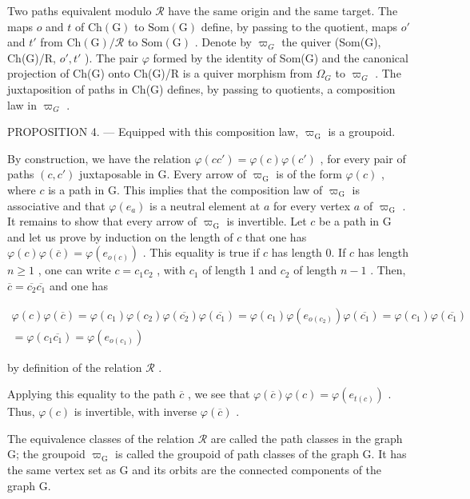 Two paths equivalent modulo \(\mathcal{R}\) have the same origin and the same target. The maps \(o\) and \(t\) of \(\mathrm{Ch(G)}\) to \(\mathrm{Som(G)}\) define, by passing to the quotient, maps \(o'\) and \(t'\) from \(\mathrm{Ch(G)/\mathcal{R}}\) to \(\mathrm{Som(G)}\) . Denote by \(\varpi_{G}\) the quiver (Som(G), Ch(G)/R, \(o', t'\) ). The pair \(\varphi\) formed by the identity of Som(G) and the canonical projection of Ch(G) onto Ch(G)/R is a quiver morphism from \(\Omega_{G}\) to \(\varpi_{G}\) . The juxtaposition of paths in Ch(G) defines, by passing to quotients, a composition law in \(\varpi_{G}\) .

PROPOSITION 4. --- Equipped with this composition law, \(\varpi_{\mathrm{G}}\) is a groupoid.

By construction, we have the relation \(\varphi(cc') = \varphi(c)\varphi(c')\) , for every pair of paths \((c,c')\) juxtaposable in G. Every arrow of \(\varpi_{\mathrm{G}}\) is of the form \(\varphi(c)\) , where \(c\) is a path in G. This implies that the composition law of \(\varpi_{\mathrm{G}}\) is associative and that \(\varphi(e_a)\) is a neutral element at \(a\) for every vertex \(a\) of \(\varpi_{\mathrm{G}}\) . It remains to show that every arrow of \(\varpi_{\mathrm{G}}\) is invertible. Let \(c\) be a path in G and let us prove by induction on the length of \(c\) that one has \(\varphi(c)\varphi(\overline{c}) = \varphi(e_{o(c)})\) . This equality is true if \(c\) has length 0. If \(c\) has length \(n \geqslant 1\) , one can write \(c = c_1c_2\) , with \(c_1\) of length 1 and \(c_2\) of length \(n - 1\) . Then, \(\overline{c} = \overline{c_2}\overline{c_1}\) and one has

\[
\begin{array}{c} \varphi (c) \varphi (\overline {{c}}) = \varphi (c _ {1}) \varphi (c _ {2}) \varphi (\overline {{c _ {2}}}) \varphi (\overline {{c _ {1}}}) = \varphi (c _ {1}) \varphi (e _ {o (c _ {2})}) \varphi (\overline {{c _ {1}}}) = \varphi (c _ {1}) \varphi (\overline {{c _ {1}}}) \\ = \varphi (c _ {1} \overline {{c _ {1}}}) = \varphi (e _ {o (c _ {1})}) \end{array}
\]

by definition of the relation \(\mathcal{R}\) .

Applying this equality to the path \(\overline{c}\) , we see that \(\varphi(\overline{c})\varphi(c)=\varphi(e_{t(c)})\) . Thus, \(\varphi(c)\) is invertible, with inverse \(\varphi(\overline{c})\) .

The equivalence classes of the relation \(\mathcal{R}\) are called the path classes in the graph G; the groupoid \(\varpi_{\mathrm{G}}\) is called the groupoid of path classes of the graph G. It has the same vertex set as G and its orbits are the connected components of the graph G.

